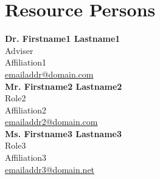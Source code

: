 %
%
%                 

\chapter{Resource Persons}
\label{sec:appendixb}

%
%
%
%

%
%

\newcommand{\resperson}[4]{\textbf{#1} \\ #2 \\ #3 \\ \url{#4}\vspace{0.5em}\\}

\resperson{Dr. Firstname1 Lastname1}{Adviser}{Affiliation1}{emailaddr@domain.com}
\resperson{Mr. Firstname2 Lastname2}{Role2}{Affiliation2}{emailaddr2@domain.com}
\resperson{Ms. Firstname3 Lastname3}{Role3}{Affiliation3}{emailaddr3@domain.net}
